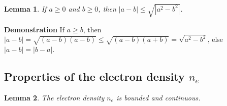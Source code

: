 \documentclass{article}
\newtheorem{lem}{Lemma}[section]
\numberwithin{equation}{section}
\newcommand{\myproof}[1]{
	\noindent \textbf{Demonstration}
	{\small	#1 \hfill \qedsymbol}
}
\begin{document}
\begin{lem}\label{lem:maj_dist_square}
	If $a\geqslant0$ and $b\geqslant0$, then $|a - b| \leqslant \sqrt{|a^2 - b^2|}$.
\end{lem}

\myproof{
	If $a \geqslant b$, then $|a - b| = \sqrt{(a-b)(a-b)} \leqslant \sqrt{(a - b)(a+b)} = \sqrt{a^2 - b^2}$, else $|a-b|=|b-a|$. 
}

\subsection{Properties of the electron density $n_e$}

\begin{lem}\label{lem:ne_continuous_space}
	The electron density $n_e$ is bounded and continuous.
\end{lem}
\end{document}
